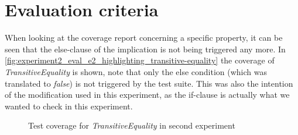 \section{Evaluation criteria}
When looking at the coverage report concerning a specific property, it can be seen that the else-clause of the implication is not being triggered any more. In \autoref{fig:experiment2_eval_e2_highlighting_transitive-equality} the coverage of \textit{TransitiveEquality} is shown, note that only the else condition (which was translated to \textit{false}) is not triggered by the test suite. This was also the intention of the modification used in this experiment, as the if-clause is actually what we wanted to check in this experiment.
\FloatBarrier
\begin{figure}[!ht]
\caption{Test coverage for \textit{TransitiveEquality} in second experiment}
\label{fig:experiment2_eval_e2_highlighting_transitive-equality}
\centering
\end{figure}
\FloatBarrier

